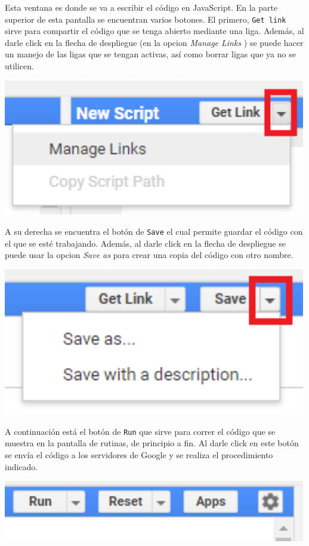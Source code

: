 \documentclass[
]{article}
\begin{document}
Esta ventana es donde se va a escribir el código en JavaScript. En la
parte superior de esta pantalla se encuentran varios botones. El
primero, \texttt{Get\ link} sirve para compartir el código que se tenga
abierto mediante una liga. Además, al darle click en la flecha de
despliegue (en la opcion \emph{Manage Links} ) se puede hacer un manejo
de las ligas que se tengan activas, así como borrar ligas que ya no se
utilicen.

\includegraphics[width=500px]{Img/links}

A su derecha se encuentra el botón de \texttt{Save} el cual permite
guardar el código con el que se esté trabajando. Además, al darle click
en la flecha de despliegue se puede usar la opcion \emph{Save as} para
crear una copia del código con otro nombre.

\includegraphics[width=500px]{Img/save}

A continuación está el botón de \texttt{Run} que sirve para correr el
código que se muestra en la pantalla de rutinas, de principio a fin. Al
darle click en este botón se envía el código a los servidores de Google
y se realiza el procedimiento indicado.

\includegraphics[width=500px]{Img/run}
\end{document}

